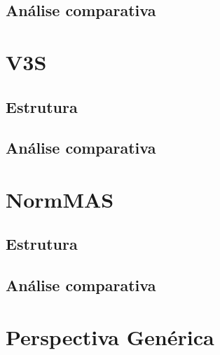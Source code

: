 \documentclass[openright]{normas-utf-tex} %
\begin{document}
		\subsection{Análise comparativa}

			

	\section{V3S}

		

		\subsection{Estrutura}

			

		\subsection{Análise comparativa}

			


	\section{NormMAS}

		

		\subsection{Estrutura}
		
			

		\subsection{Análise comparativa}

			

	\section{Perspectiva Genérica}

	

\label{chap:anacomp}
\end{document}
